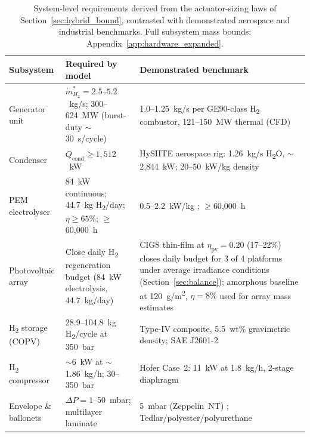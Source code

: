 \documentclass[applsci,article,submit,pdftex,moreauthors]{Definitions/mdpi}
\newcommand{\dotmstar}{\dot{m}_{H_2}^{*}}
\begin{document}
\begin{table}[H]
\centering
\footnotesize
\caption{System-level requirements derived from the actuator-sizing laws of Section~\ref{sec:hybrid_bound}, contrasted with demonstrated aerospace and industrial benchmarks. Full subsystem mass bounds: Appendix~\ref{app:hardware_expanded}.}
\label{tab:hardware_validation}
\renewcommand{\arraystretch}{1.15}
\begin{tabular}{@{} l p{4.2cm} p{5.8cm} @{}}
\toprule
\textbf{Subsystem} & \textbf{Required by model} & \textbf{Demonstrated benchmark} \\
\midrule
Generator unit
 & $\dotmstar = 2.5$--$5.2$~kg/s; 300--624~MW (burst-duty ${\sim}$30~s/cycle)
 & 1.0--1.25~kg/s per GE90-class H\textsubscript{2} combustor, 121--150~MW thermal (CFD) \cite{Cameretti2025} \\
\midrule
Condenser
 & $Q_\text{cond} \geq 1{,}512$~kW
 & HySIITE aerospace rig: 1.26~kg/s H\textsubscript{2}O, ${\sim}$2{,}844~kW; 20--50~kW/kg density \cite{Hesselgreaves2016} \\
\midrule
PEM electrolyser
 & 84~kW continuous; 44.7~kg H\textsubscript{2}/day; $\eta \geq 65\%$; $\geq$60{,}000~h
 & 0.5--2.2~kW/kg \cite{Zhang2025PEMFC,Kohout2003FuelCell}; $\geq$60{,}000~h \cite{Esmaeili2023PEM} \\
\midrule
Photovoltaic array
 & Close daily H\textsubscript{2} regeneration budget (84~kW electrolysis, 44.7~kg/day)
 & CIGS thin-film at $\eta_\text{pv} = 0.20$ (17--22\%) closes daily budget for 3 of 4 platforms under average irradiance conditions (Section~\ref{sec:balance}); amorphous baseline at 120~g/m\textsuperscript{2}, $\eta = 8\%$ \cite{Pande2018} used for array mass estimates \\
\midrule
H\textsubscript{2} storage (COPV)
 & 28.9--104.8~kg H\textsubscript{2}/cycle at 350~bar
 & Type-IV composite, 5.5~wt\% gravimetric density; SAE J2601-2 \cite{SAE2023} \\
\midrule
H\textsubscript{2} compressor
 & ${\sim}$6~kW at ${\sim}$1.86~kg/h; 30--350~bar
 & Hofer Case~2: 11~kW at 1.8~kg/h, 2-stage diaphragm \cite{Giuffrida2025,Letsios2026,Chalkiadakis2023} \\
\midrule
Envelope \& ballonets
 & $\Delta P = 1$--50~mbar; multilayer laminate
 & 5~mbar (Zeppelin~NT) \cite{Stockbridge2012Airship}; Tedlar/polyester/polyurethane \cite{Lobner2024Airships} \\
\bottomrule
\end{tabular}
\end{table}
\end{document}
